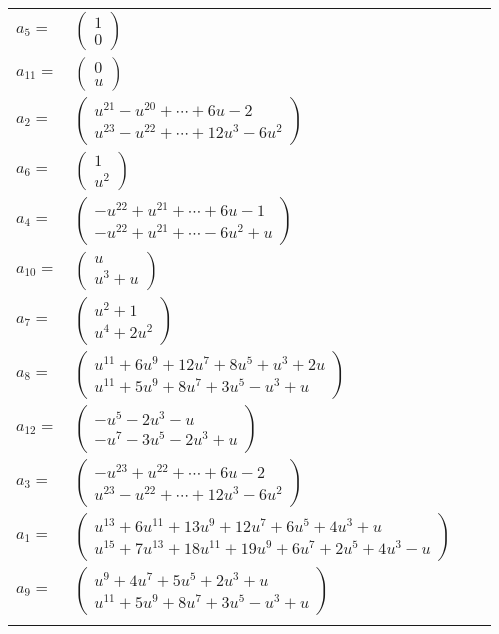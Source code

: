 \documentclass[1p]{elsarticle_modified}
\theoremstyle{definition}
\begin{document}
\begin{tabular}{m{7pt} m{180pt} m{7pt} m{180pt} }
\flushright $a_{5}=$&$\begin{pmatrix}1\\0\end{pmatrix}$ \\
\flushright $a_{11}=$&$\begin{pmatrix}0\\u\end{pmatrix}$ \\
\flushright $a_{2}=$&$\begin{pmatrix}u^{21}- u^{20}+\cdots+6 u-2\\u^{23}- u^{22}+\cdots+12 u^3-6 u^2\end{pmatrix}$ \\
\flushright $a_{6}=$&$\begin{pmatrix}1\\u^2\end{pmatrix}$ \\
\flushright $a_{4}=$&$\begin{pmatrix}- u^{22}+u^{21}+\cdots+6 u-1\\- u^{22}+u^{21}+\cdots-6 u^2+u\end{pmatrix}$ \\
\flushright $a_{10}=$&$\begin{pmatrix}u\\u^3+u\end{pmatrix}$ \\
\flushright $a_{7}=$&$\begin{pmatrix}u^2+1\\u^4+2 u^2\end{pmatrix}$ \\
\flushright $a_{8}=$&$\begin{pmatrix}u^{11}+6 u^9+12 u^7+8 u^5+u^3+2 u\\u^{11}+5 u^9+8 u^7+3 u^5- u^3+u\end{pmatrix}$ \\
\flushright $a_{12}=$&$\begin{pmatrix}- u^5-2 u^3- u\\- u^7-3 u^5-2 u^3+u\end{pmatrix}$ \\
\flushright $a_{3}=$&$\begin{pmatrix}- u^{23}+u^{22}+\cdots+6 u-2\\u^{23}- u^{22}+\cdots+12 u^3-6 u^2\end{pmatrix}$ \\
\flushright $a_{1}=$&$\begin{pmatrix}u^{13}+6 u^{11}+13 u^9+12 u^7+6 u^5+4 u^3+u\\u^{15}+7 u^{13}+18 u^{11}+19 u^9+6 u^7+2 u^5+4 u^3- u\end{pmatrix}$ \\
\flushright $a_{9}=$&$\begin{pmatrix}u^9+4 u^7+5 u^5+2 u^3+u\\u^{11}+5 u^9+8 u^7+3 u^5- u^3+u\end{pmatrix}$\\&\end{tabular}
\end{document}

